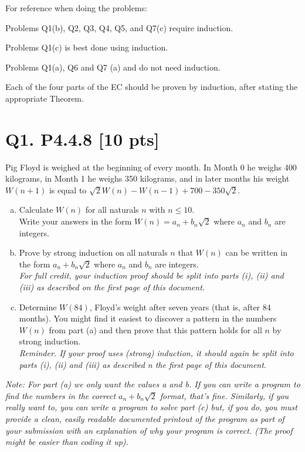 \documentclass[12pt]{article}
\begin{document}
	For reference when doing the problems:

	Problems Q1(b), Q2, Q3, Q4, Q5, and Q7(c) require induction.

	Problems Q1(c) is best done using induction.

	Problems Q1(a), Q6 and Q7 (a) and do not need induction.

	Each of the four parts of the EC should be proven by induction, after stating the
	appropriate Theorem.
	\newpage

	\section*{\textbf{Q1. P4.4.8} [10 pts]}
	Pig Floyd is weighed at the beginning of every month. In Month 0 he weighs 400
	kilograms, in Month 1 he weighs 350 kilograms, and in later months his weight
	$W(n + 1)$ is equal to $\sqrt{2}W(n) - W(n - 1) + 700 - 350 \sqrt{2}$.
	\begin{enumerate}[(a)]
		\item Calculate $W(n)$ for all naturals $n$ with $n \leq 10.$\\
			Write your answers in the form $W(n) = a_{n} + b_{n} \sqrt{2}$ where
			$a_{n}$ and $b_{n}$ are integers.

		\item Prove by strong induction on all naturals $n$ that $W(n)$ can be written
			in the form $a_{n} + b_{n} \sqrt{2}$ where $a_{n}$ and $b_{n}$ are integers.\\
			{\em \small For full credit, your induction proof should be split into parts (i), (ii) and (iii) as described on the first page of this document.}

		\item Determine $W(84)$, Floyd’s weight after seven years (that is, after 84
			months). You might find it easiest to discover a pattern in the numbers
			$W(n)$ from part (a) and then prove that this pattern holds for all $n$ by
			strong induction. \\
			{\em \small Reminder. If your proof uses (strong) induction, it should again be split into parts (i), (ii) and (iii) as described n the first page of this document.}
	\end{enumerate}

	\textit{Note: For part (a) we only want the values a and b. If you can write a
	program to find the numbers in the correct $a_{n} + b_{n} \sqrt{2}$ format, that's
	fine. Similarly, if you really want to, you can write a program to solve part
	(c) but, if you do, you must provide a clean, easily readable documented printout
	of the program as part of your submission with an explanation of why your program
	is correct. (The proof might be easier than coding it up). }
\end{document}
